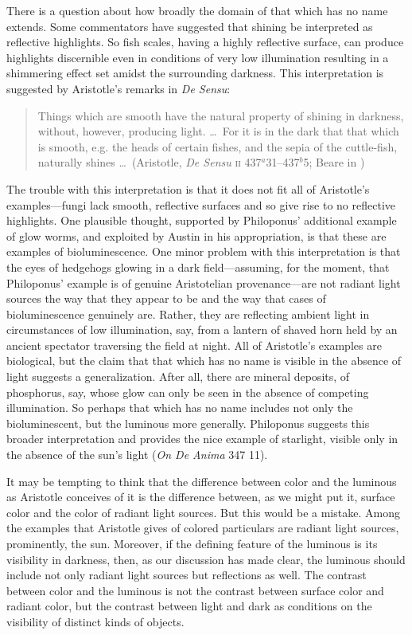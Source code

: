 There is a question about how broadly the domain of that which has no name extends. Some commentators have suggested that shining be interpreted as reflective highlights. So fish scales, having a highly reflective surface, can produce highlights discernible even in conditions of very low illumination resulting in a shimmering effect set amidst the surrounding darkness. This interpretation is suggested by Aristotle's remarks in \emph{De Sensu}: 
\begin{quote}
	Things which are smooth have the natural property of shining in darkness, without, however, producing light. \ldots\ For it is in the dark that that which is smooth, e.g. the heads of certain fishes, and the sepia of the cuttle-fish, naturally shines \ldots\ (Aristotle, \emph{De Sensu} \textsc{ii} 437\( ^{a} \)31--437\( ^{b} \)5; Beare in \citealt[4]{Barnes:1984uq})
\end{quote}
The trouble with this interpretation is that it does not fit all of Aristotle's examples---fungi lack smooth, reflective surfaces and so give rise to no reflective highlights. One plausible thought, supported by Philoponus' additional example of glow worms, and exploited by Austin in his appropriation, is that these are examples of bioluminescence. One minor problem with this interpretation is that the eyes of hedgehogs glowing in a dark field---assuming, for the moment, that Philoponus' example is of genuine Aristotelian provenance---are not radiant light sources the way that they appear to be and the way that cases of  bioluminescence genuinely are. Rather, they are reflecting ambient light in circumstances of low illumination, say, from a lantern of shaved horn held by an ancient spectator traversing the field at night. All of Aristotle's examples are biological, but the claim that that which has no name is visible in the absence of light suggests a generalization. After all, there are mineral deposits, of phosphorus, say, whose glow can only be seen in the absence of competing illumination. So perhaps that which has no name includes not only the bioluminescent, but the luminous more generally. Philoponus suggests this broader interpretation and provides the nice example of starlight, visible only in the absence of the sun's light (\emph{On \emph{De Anima}} 347 11). 

It may be tempting to think that the difference between color and the luminous as Aristotle conceives of it is the difference between, as we might put it, surface color and the color of radiant light sources. But this would be a mistake. Among the examples that Aristotle gives of colored particulars are radiant light sources, prominently, the sun. Moreover, if the defining feature of the luminous is its visibility in darkness, then, as our discussion has made clear, the luminous should include not only radiant light sources but reflections as well. The contrast between color and the luminous is not the contrast between surface color and radiant color, but the contrast between light and dark as conditions on the visibility of distinct kinds of objects.

